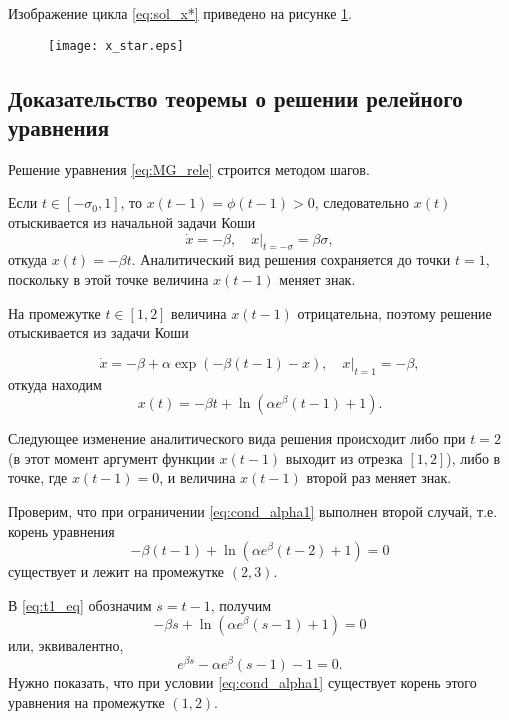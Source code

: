 Изображение цикла \eqref{eq:sol_x*} приведено на рисунке \ref{fig:x_star}.

\begin{figure}
\centering
  \texttt{[image: x\_star.eps]}
  \label{fig:x_star}
\end{figure}


\subsection{Доказательство теоремы о решении релейного уравнения}

Решение уравнения \eqref{eq:MG_rele} строится методом шагов.

Если $t \in [-\sigma_0, 1]$, то $x(t - 1) = \phi(t - 1) > 0$, следовательно $x(t)$ отыскивается из начальной задачи Коши
\begin{equation}
    \dot{x} = -\beta, \quad x|_{t = -\sigma} = \beta \sigma,
\end{equation}
откуда $x(t) = -\beta t$. Аналитический вид решения сохраняется до точки $t = 1$, поскольку в этой точке величина $x(t - 1)$ меняет знак.

На промежутке $t \in [1, 2]$ величина $x(t - 1)$ отрицательна, поэтому решение отыскивается из задачи Коши

\begin{equation}
    \dot{x} = -\beta + \alpha\exp(-\beta(t - 1) - x), \quad x|_{t = 1} = -\beta,
\end{equation}
откуда находим
\begin{equation}
    x(t) = -\beta t +\ln(\alpha e^{\beta}(t - 1) + 1).
\end{equation}

Следующее изменение аналитического вида решения происходит либо при $t = 2$ (в этот момент аргумент функции $x(t - 1)$ выходит из отрезка $[1, 2]$), либо в точке, где $x(t - 1) = 0$, и величина $x(t - 1)$ второй раз меняет знак.

Проверим, что при ограничении \eqref{eq:cond_alpha1} выполнен второй случай, т.е. корень уравнения
\begin{equation}
\label{eq:t1_eq}
    -\beta (t - 1) + \ln(\alpha e^{\beta}(t - 2) + 1) = 0
\end{equation}
существует и лежит на промежутке $(2, 3)$.

В \eqref{eq:t1_eq} обозначим $s = t - 1$, получим
%
$$-\beta s + \ln(\alpha e^{\beta} (s - 1) + 1) = 0$$
%
или, эквивалентно,
%
\begin{equation}
\label{eq:t1_eq2}
e^{\beta s} - \alpha e^{\beta} (s - 1) - 1 = 0.
\end{equation}
Нужно показать, что при условии \eqref{eq:cond_alpha1} существует корень этого уравнения на промежутке $(1, 2)$.


